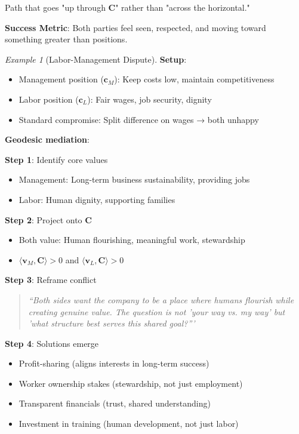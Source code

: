 \documentclass[11pt,a4paper]{article}
\theoremstyle{definition}
\theoremstyle{remark}
\newtheorem{example}{Example}[section]
\newcommand{\cc}{\mathbf{c}}
\begin{document}
\begin{enumerate}
\begin{protocol}
\begin{enumerate}
        Path that goes "up through \(\mathbf{C}\)" rather than "across the horizontal."
\end{enumerate}

\textbf{Success Metric}: Both parties feel seen, respected, and moving toward something greater than positions.
\end{protocol}

\begin{example}[Labor-Management Dispute]
\textbf{Setup}:
\begin{itemize}
    \item Management position (\(\cc_M\)): Keep costs low, maintain competitiveness
    \item Labor position (\(\cc_L\)): Fair wages, job security, dignity
    \item Standard compromise: Split difference on wages → both unhappy
\end{itemize}

\textbf{Geodesic mediation}:

\textbf{Step 1}: Identify core values
\begin{itemize}
    \item Management: Long-term business sustainability, providing jobs
    \item Labor: Human dignity, supporting families
\end{itemize}

\textbf{Step 2}: Project onto \(\mathbf{C}\)
\begin{itemize}
    \item Both value: Human flourishing, meaningful work, stewardship
    \item \(\langle \mathbf{v}_M, \mathbf{C} \rangle > 0\) and \(\langle \mathbf{v}_L, \mathbf{C} \rangle > 0\)
\end{itemize}

\textbf{Step 3}: Reframe conflict
\begin{quote}
\textit{``Both sides want the company to be a place where humans flourish while creating genuine value. The question is not 'your way vs. my way' but 'what structure best serves this shared goal?'''}
\end{quote}

\textbf{Step 4}: Solutions emerge
\begin{itemize}
    \item Profit-sharing (aligns interests in long-term success)
    \item Worker ownership stakes (stewardship, not just employment)
    \item Transparent financials (trust, shared understanding)
    \item Investment in training (human development, not just labor)
\end{itemize}


\end{example}
\end{enumerate}
\end{document}
